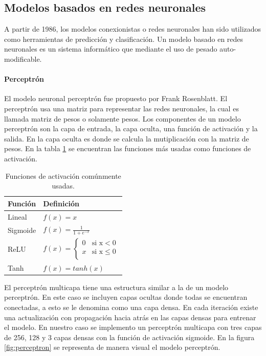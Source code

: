 \subsection{Modelos basados en redes neuronales}
A partir de 1986\cite{Rumelhart_1987}, los modelos conexionistas o redes neuronales han sido utilizados como herramientas de predicción y clasificación. Un modelo basado en redes neuronales es un sistema informático que mediante el uso de pesado auto-modificable.

\paragraph{Perceptrón}
El modelo neuronal perceptrón fue propuesto por Frank Rosenblatt\cite{Rosenblatt_1958}. El perceptrón usa una matriz para representar las redes neuronales, la cual es llamada matriz de pesos o solamente pesos. Los componentes de un modelo perceptrón son la capa de entrada, la capa oculta, una función de activación y la salida. En la capa oculta es donde se calcula la mutiplicación con la matriz de pesos. En la tabla \ref{table:activation_functions} se encuentran las funciones más usadas como funciones de activación.
\begin{table}[H]
	\centering
	\begin{tabular}{ll} \hline
		\textbf{Función} & \textbf{Definición}         \\ \hline
		Lineal           & $f(x)=x$                    \\[0.1cm]
		Sigmoide         & $f(x)=\frac{1}{1+e^{-x}}$   \\[0.1cm]
		ReLU             & $f(x)=\begin{cases}
				                         0 & \text{si x}<0     \\
				                         x & \text{si x}\leq 0 \\
			                         \end{cases}$ \\ [0.1cm]
		Tanh             & $f(x)=tanh(x)$              \\ [0.1cm] \hline
	\end{tabular}
	\caption{Funciones de activación comúnmente usadas.}
	\label{table:activation_functions}
\end{table}
El perceptrón multicapa tiene una estructura similar a la de un modelo perceptrón. En este caso se incluyen capas ocultas donde todas se encuentran conectadas, a esto se le denomina como una capa densa. En cada iteración existe una actualización con propagación hacia atrás en las capas densas para entrenar el modelo. En nuestro caso se implemento un perceptrón multicapa con tres capas de 256, 128 y 3 capas densas con la función de activación sigmoide. En la figura \ref{fig:perceptron} se representa de manera visual el modelo perceptrón.
